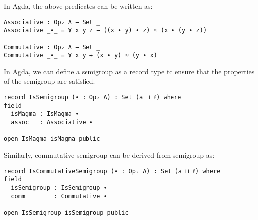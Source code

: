 In Agda, the above predicates can be written as:

\begin{verbatim}
Associative : Op₂ A → Set _
Associative _∙_ = ∀ x y z → ((x ∙ y) ∙ z) ≈ (x ∙ (y ∙ z))

Commutative : Op₂ A → Set _
Commutative _∙_ = ∀ x y → (x ∙ y) ≈ (y ∙ x)
\end{verbatim}

In Agda, we can define a semigroup as a record type to ensure that the
properties of the semigroup are satisfied.

\begin{verbatim}
record IsSemigroup (∙ : Op₂ A) : Set (a ⊔ ℓ) where
field
  isMagma : IsMagma ∙
  assoc   : Associative ∙

open IsMagma isMagma public
\end{verbatim}

Similarly, commutative semigroup can be derived from semigroup as: 

\begin{verbatim}
record IsCommutativeSemigroup (∙ : Op₂ A) : Set (a ⊔ ℓ) where
field
  isSemigroup : IsSemigroup ∙
  comm        : Commutative ∙

open IsSemigroup isSemigroup public
\end{verbatim}

